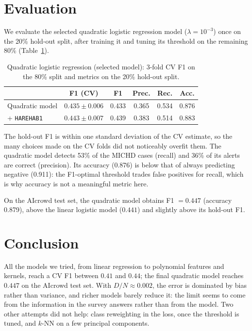 \documentclass[10pt,conference,compsocconf]{IEEEtran}
\begin{document}
\section{Evaluation}
We evaluate the selected quadratic logistic regression model ($\lambda = 10^{-3}$) once on the 20\% hold-out split, after training it and tuning its threshold on the remaining 80\% (Table~\ref{tab:eval}).

\begin{table}[htbp]
\centering
\caption{Quadratic logistic regression (selected model): 3-fold CV F1 on the 80\% split and metrics on the 20\% hold-out split.}
\label{tab:eval}
\begin{tabular}{lccccc}
\hline
 & F1 (CV) & F1 & Prec. & Rec. & Acc. \\
\hline
Quadratic model & $0.435 \pm 0.006$ & 0.433 & 0.365 & 0.534 & 0.876 \\
+ \texttt{HAREHAB1} & $0.443 \pm 0.007$ & 0.439 & 0.383 & 0.514 & 0.883 \\
\hline
\end{tabular}
\end{table}

The hold-out F1 is within one standard deviation of the CV estimate, so the many choices made on the CV folds did not noticeably overfit them. The quadratic model detects 53\% of the MICHD cases (recall) and 36\% of its alerts are correct (precision). Its accuracy (0.876) is below that of always predicting negative (0.911): the F1-optimal threshold trades false positives for recall, which is why accuracy is not a meaningful metric here.

On the AIcrowd test set, the quadratic model obtains F1 $= 0.447$ (accuracy 0.879), above the linear logistic model ($0.441$) and slightly above its hold-out F1.

\section{Conclusion}
All the models we tried, from linear regression to polynomial features and kernels, reach a CV F1 between $0.41$ and $0.44$; the final quadratic model reaches $0.447$ on the AIcrowd test set. With $D/N \approx 0.002$, the error is dominated by bias rather than variance, and richer models barely reduce it: the limit seems to come from the information in the survey answers rather than from the model. Two other attempts did not help: class reweighting in the loss, once the threshold is tuned, and $k$-NN on a few principal components.



\end{document}
